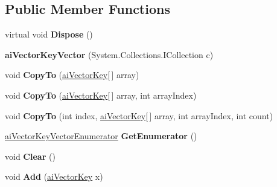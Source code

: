 \subsection*{Public Member Functions}
\begin{DoxyCompactItemize}
\item 
\hypertarget{classai_vector_key_vector_a032694b214e0a2a383cec8896a61fd91}{virtual void {\bfseries Dispose} ()}\label{classai_vector_key_vector_a032694b214e0a2a383cec8896a61fd91}

\item 
\hypertarget{classai_vector_key_vector_a362ca89ed2248151c56c5549fc859c27}{{\bfseries ai\+Vector\+Key\+Vector} (System.\+Collections.\+I\+Collection c)}\label{classai_vector_key_vector_a362ca89ed2248151c56c5549fc859c27}

\item 
\hypertarget{classai_vector_key_vector_a0d958c143396e4107e9733cdc39159bb}{void {\bfseries Copy\+To} (\hyperlink{structai_vector_key}{ai\+Vector\+Key}\mbox{[}$\,$\mbox{]} array)}\label{classai_vector_key_vector_a0d958c143396e4107e9733cdc39159bb}

\item 
\hypertarget{classai_vector_key_vector_a004713b511c2b3b3ba9945b567589f42}{void {\bfseries Copy\+To} (\hyperlink{structai_vector_key}{ai\+Vector\+Key}\mbox{[}$\,$\mbox{]} array, int array\+Index)}\label{classai_vector_key_vector_a004713b511c2b3b3ba9945b567589f42}

\item 
\hypertarget{classai_vector_key_vector_afb9bad9dcc96ab0add3f03abf29460c6}{void {\bfseries Copy\+To} (int index, \hyperlink{structai_vector_key}{ai\+Vector\+Key}\mbox{[}$\,$\mbox{]} array, int array\+Index, int count)}\label{classai_vector_key_vector_afb9bad9dcc96ab0add3f03abf29460c6}

\item 
\hypertarget{classai_vector_key_vector_a35fa7b37aec0672fb9d544092ba72ebd}{\hyperlink{classai_vector_key_vector_1_1ai_vector_key_vector_enumerator}{ai\+Vector\+Key\+Vector\+Enumerator} {\bfseries Get\+Enumerator} ()}\label{classai_vector_key_vector_a35fa7b37aec0672fb9d544092ba72ebd}

\item 
\hypertarget{classai_vector_key_vector_a3bc6c21d15e8f165d82b536641229cfd}{void {\bfseries Clear} ()}\label{classai_vector_key_vector_a3bc6c21d15e8f165d82b536641229cfd}

\item 
\hypertarget{classai_vector_key_vector_ae56cfc9cf38736f2e690f9faceb9ff0e}{void {\bfseries Add} (\hyperlink{structai_vector_key}{ai\+Vector\+Key} x)}\label{classai_vector_key_vector_ae56cfc9cf38736f2e690f9faceb9ff0e}


\end{DoxyCompactItemize}
